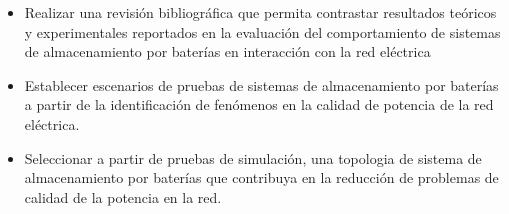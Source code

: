 
\begin{itemize}
    \item Realizar una revisión bibliográfica que permita contrastar resultados teóricos y experimentales reportados en la evaluación del comportamiento de sistemas de almacenamiento por baterías en interacción con la red eléctrica
    \item Establecer escenarios de pruebas de sistemas de almacenamiento por baterías a partir de la identificación de fenómenos en la calidad de potencia de la red eléctrica.
    \item Seleccionar a partir de pruebas de simulación, una topologia de sistema de almacenamiento por baterías que contribuya en la reducción de problemas de calidad de la potencia en la red.
    
\end{itemize}